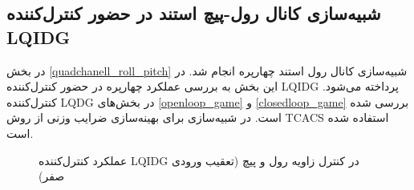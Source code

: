 \subsection{شبیه‌سازی کانال رول-پیچ استند در حضور کنترل‌کننده LQIDG}
در بخش
\ref{quadchanell_roll_pitch}
شبیه‌سازی کانال رول استند چهارپره انجام شد. در این بخش به بررسی عملکرد چهارپره در حضور کنترل‌کننده LQIDG پرداخته می‌شود. کنترل‌کننده LQDG در بخش‌های
\ref{openloop_game}
و
\ref{closedloop_game}
بررسی شده است.
 در شبیه‌سازی برای بهینه‌سازی ضرایب وزنی از روش
TCACS \cite{Karimi2010}
استفاده شده است.
%	
\begin{figure}[H]
	\centering
	\caption{‫‪عملکرد کنترل‌کننده LQIDG در کنترل زاویه رول و پیچ (تعقیب ورودی صفر)}
\end{figure}



